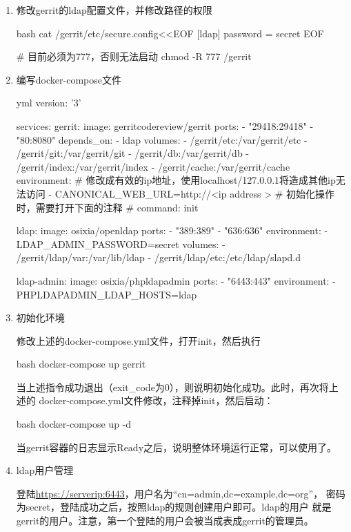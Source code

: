 \begin{enumerate}
  \item 修改gerrit的ldap配置文件，并修改路径的权限

  \begin{code-block}{bash}
  cat /gerrit/etc/secure.config<<EOF
  [ldap]
    password = secret
  EOF

  # 目前必须为777，否则无法启动
  chmod -R 777 /gerrit
  \end{code-block}

  \item 编写docker-compose文件

  \begin{code-block}{yml}
  version: '3'

  services:
    gerrit:
      image: gerritcodereview/gerrit
      ports:
        - "29418:29418"
        - "80:8080"
      depends_on:
        - ldap
      volumes:
        - /gerrit/etc:/var/gerrit/etc
        - /gerrit/git:/var/gerrit/git
        - /gerrit/db:/var/gerrit/db
        - /gerrit/index:/var/gerrit/index
        - /gerrit/cache:/var/gerrit/cache
      environment:
        # 修改成有效的ip地址，使用localhost/127.0.0.1将造成其他ip无法访问
        - CANONICAL_WEB_URL=http://<ip address >
      # 初始化操作时，需要打开下面的注释
      # command: init

    ldap:
      image: osixia/openldap
      ports:
        - "389:389"
        - "636:636"
      environment:
        - LDAP_ADMIN_PASSWORD=secret
      volumes:
        - /gerrit/ldap/var:/var/lib/ldap
        - /gerrit/ldap/etc:/etc/ldap/slapd.d

    ldap-admin:
      image: osixia/phpldapadmin
      ports:
        - "6443:443"
      environment:
        - PHPLDAPADMIN_LDAP_HOSTS=ldap
  \end{code-block}

  \item 初始化环境

  修改上述的docker-compose.yml文件，打开init，然后执行
  \begin{code-block}{bash}
  docker-compose up gerrit
  \end{code-block}
  当上述指令成功退出（exit\_code为0），则说明初始化成功。此时，再次将上述的
  docker-compose.yml文件修改，注释掉init，然后启动：
  \begin{code-block}{bash}
  docker-compose up -d
  \end{code-block}
  当gerrit容器的日志显示Ready之后，说明整体环境运行正常，可以使用了。

  \item ldap用户管理

  登陆\url{https://serverip:6443}，用户名为“cn=admin,dc=example,dc=org”，
  密码为secret，登陆成功之后，按照ldap的规则创建用户即可。ldap的用户
  就是gerrit的用户。注意，第一个登陆的用户会被当成表成gerrit的管理员。

\end{enumerate}

